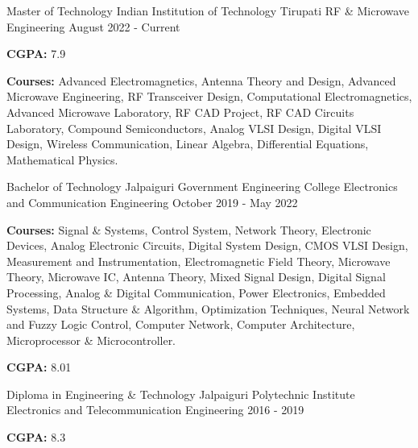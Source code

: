

\begin{cventries}

  \cventry
    {Master of Technology} %
    {Indian Institution of Technology Tirupati} %
    {RF \& Microwave Engineering } %
    {August 2022 - Current} %
    {
      \begin{cvitems} %
        \item {\textbf{CGPA:} 7.9}
        \item {\textbf{Courses:} Advanced Electromagnetics, Antenna Theory and Design, Advanced Microwave Engineering, RF Transceiver Design, Computational Electromagnetics, Advanced Microwave Laboratory, RF CAD Project, RF CAD Circuits Laboratory, Compound Semiconductors, Analog VLSI Design, Digital VLSI Design, Wireless Communication, Linear Algebra, Differential Equations, Mathematical Physics.}
      \end{cvitems}
    }
    
  \cventry
    {Bachelor of Technology} %
    {Jalpaiguri Government Engineering College} %
    {Electronics and Communication Engineering} %
    {October 2019 - May 2022} %
    {
      \begin{cvitems} %
        \item {\textbf{Courses:} Signal \& Systems, Control System, Network Theory, Electronic Devices, Analog Electronic Circuits, Digital System Design, CMOS VLSI Design, Measurement and Instrumentation, Electromagnetic Field Theory, Microwave Theory, Microwave IC, Antenna Theory, Mixed Signal Design, Digital Signal Processing, Analog \& Digital Communication, Power Electronics, Embedded Systems, Data Structure \& Algorithm, Optimization Techniques, Neural Network and Fuzzy Logic Control, Computer Network, Computer Architecture, Microprocessor \& Microcontroller.}
        \item {\textbf{CGPA:} 8.01}
      \end{cvitems}
    }

  \cventry
    {Diploma in Engineering \& Technology} %
    {Jalpaiguri Polytechnic Institute} %
    {Electronics and Telecommunication Engineering} %
    {2016 - 2019} %
    {
      \begin{cvitems} %
        \item {\textbf{CGPA:} 8.3}
      \end{cvitems}
    }


\end{cventries}
